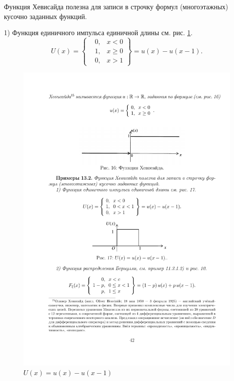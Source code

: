\begin{example}
\label{ex:13.2}

	Функция Хевисайда полезна для записи в строчку формул (многоэтажных) кусочно заданных функций.

1) Функция единичного импульса единичной длины см. рис. \ref{fig17}.
\begin{equation*}
U(x) = \left\{
 \begin{aligned}
   &0,&x<0\\
   &1,&x\geqslant 0\\
   &0,&x>1
 \end{aligned}\right\}
 =u(x)-u(x-1).
\end{equation*}

\begin{figure}[H]
	\centering
	\includegraphics[]{pic/pic17}
	\caption{$U(x) = u(x)-u(x-1)$}
	\label{fig17}
\end{figure}


\end{example}
